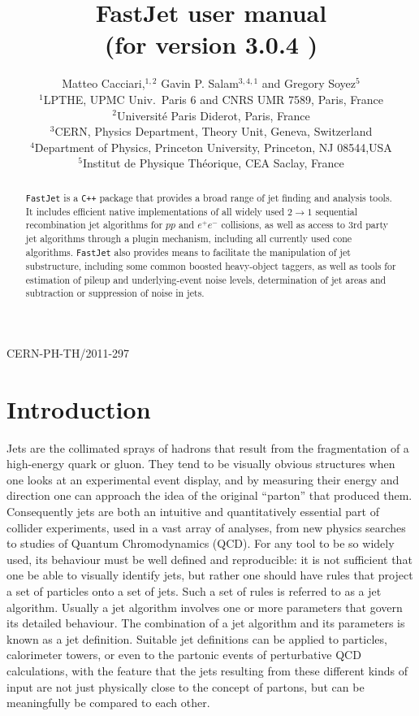 \documentclass[12pt,a4]{article}
\title{\sf FastJet user manual%
  \\ \large (for version
  3.0.4%
  )
}
\author{Matteo Cacciari,$^{1,2}$ Gavin P. Salam$^{3,4,1}$ and Gregory Soyez$^{5}$\\[10pt]
  \normalsize
  $^1$LPTHE, UPMC Univ.~Paris 6 and CNRS UMR 7589, Paris, France\\
  \normalsize
  $^2$Universit\'e Paris Diderot, Paris, France\\
  \normalsize
  $^3$CERN, Physics Department, Theory Unit, Geneva, Switzerland\\
  \normalsize
  $^4$Department of Physics, Princeton University, Princeton, NJ 08544,USA\\
  \normalsize
  $^5$Institut de Physique Th\'eorique, CEA Saclay, France
}
\date{}
\newcommand{\fastjet}{\texttt{FastJet}\xspace}
\newcommand{\ttt}[1]{{\small\texttt{#1}}}
\begin{document}
\maketitle

\vspace{-10cm}
\begin{flushright}
  CERN-PH-TH/2011-297
\end{flushright}
\vspace{9cm}


\begin{abstract}

  \fastjet is a \ttt{C++} package that provides a broad range of jet
  finding and analysis tools.
  It includes efficient native implementations of all widely used $2\to 1$
  sequential recombination jet algorithms for $pp$ and $e^+e^-$
  collisions, as well as access to 3rd party jet algorithms through a
  plugin mechanism, including all currently used cone algorithms.
  \fastjet also provides means to facilitate the manipulation of jet
  substructure, including some common boosted heavy-object taggers, as
  well as tools for estimation of pileup and underlying-event noise
  levels, determination of jet areas and subtraction or suppression
  of noise in jets.

\end{abstract}

\newpage
\tableofcontents
\newpage

\section{Introduction}




Jets are the collimated sprays of hadrons that result from the
fragmentation of a high-energy quark or gluon.
%
They tend to be visually obvious structures when one looks at an
experimental event display, and by measuring their energy and
direction one can approach the idea of the original ``parton'' that
produced them.
%
Consequently jets are both an intuitive and quantitatively essential
part of collider experiments, used in a vast array of analyses, from
new physics searches to studies of Quantum Chromodynamics (QCD).
%
For any tool to be so widely used, its behaviour must be well defined
and reproducible: it is not sufficient that one be able to visually
identify jets, but rather one should have rules that project a set of
particles onto a set of jets.
%
Such a set of rules is referred to as a jet algorithm.
%
Usually a jet algorithm involves one or more parameters that govern
its detailed behaviour.
%
The combination of a jet algorithm and its parameters is known as a
jet definition.
%
Suitable jet definitions can be applied to particles,
calorimeter towers, or even to the partonic events of perturbative QCD
calculations, with the feature that the jets resulting from these
different kinds of input are not just physically close to the
concept of partons, but can be meaningfully be compared to each other.
\end{document}

